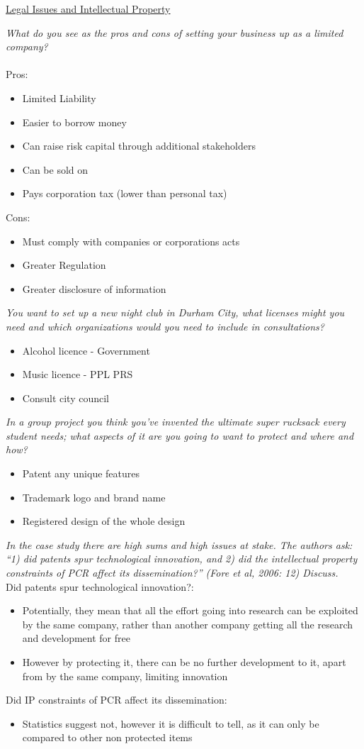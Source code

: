 \documentclass{article}[18pt]
\begin{document}
\begin{center}
\underline{\huge Legal Issues and Intellectual Property}
\end{center}
\textit{What do you see as the pros and cons of setting your business up as a
limited company?}\\
\\
Pros:
\begin{itemize}
	\item Limited Liability
	\item Easier to borrow money
	\item Can raise risk capital through additional stakeholders
	\item Can be sold on
	\item Pays corporation tax (lower than personal tax)
\end{itemize}
Cons:
\begin{itemize}
	\item Must comply with companies or corporations acts
	\item Greater Regulation
	\item Greater disclosure of information
\end{itemize}
\textit{You want to set up a new night club in Durham City, what licenses might
you need and which organizations would you need to include in
consultations?
}
\begin{itemize}
	\item Alcohol licence - Government
	\item Music licence - PPL PRS
	\item Consult city council 
\end{itemize}
\textit{In a group project you think you’ve invented the ultimate super
rucksack every student needs; what aspects of it are you going to want
to protect and where and how? }
\begin{itemize}
	\item Patent any unique features
	\item Trademark logo and brand name
	\item Registered design of the whole design
\end{itemize}
\textit{In the case study there are high sums and high issues at stake. The
authors ask: “1) did patents spur technological innovation, and 2) did the
intellectual property constraints of PCR affect its dissemination?” (Fore
et al, 2006: 12) Discuss. }\\
Did patents spur technological innovation?:
\begin{itemize}
	\item Potentially, they mean that all the effort going into research can be exploited by the same company, rather than another company getting all the research and development for free
	\item However by protecting it, there can be no further development to it, apart from by the same company, limiting innovation
\end{itemize}
Did IP constraints of PCR affect its dissemination:
\begin{itemize}
	\item Statistics suggest not, however it is difficult to tell, as it can only be compared to other non protected items
\end{itemize} 
\end{document}
